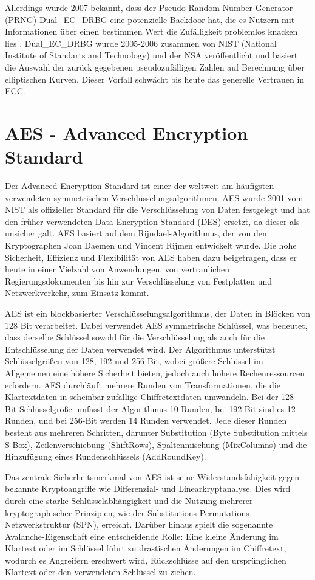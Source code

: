 \documentclass{scrreprt}
\begin{document}
Allerdings wurde 2007 bekannt, dass der Pseudo Random Number Generator (PRNG) Dual\_EC\_DRBG eine potenzielle Backdoor hat, die es Nutzern mit Informationen über einen bestimmen Wert die Zufälligkeit problemlos knacken lies \cite{ecc-green2013backdoor}. Dual\_EC\_DRBG wurde 2005-2006 zusammen von NIST (National Institute of Standarts and Technology) und der NSA veröffentlicht und basiert die Auswahl der zurück gegebenen pseudozufälligen Zahlen auf Berechnung über elliptischen Kurven. Dieser Vorfall schwächt bis heute das generelle Vertrauen in ECC. \cite{ecc-cloud2013elliptic}

\section{AES - Advanced Encryption Standard}
\label{sec:aes}
Der Advanced Encryption Standard ist einer der weltweit am häufigsten verwendeten symmetrischen Verschlüsselungsalgorithmen. AES wurde 2001 vom NIST als offizieller Standard für die Verschlüsselung von Daten festgelegt und hat den früher verwendeten Data Encryption Standard (DES) ersetzt, da dieser als unsicher galt. AES basiert auf dem Rijndael-Algorithmus, der von den Kryptographen Joan Daemen und Vincent Rijmen entwickelt wurde. Die hohe Sicherheit, Effizienz und Flexibilität von AES haben dazu beigetragen, dass er heute in einer Vielzahl von Anwendungen, von vertraulichen Regierungsdokumenten bis hin zur Verschlüsselung von Festplatten und Netzwerkverkehr, zum Einsatz kommt.

AES ist ein blockbasierter Verschlüsselungsalgorithmus, der Daten in Blöcken von 128 Bit verarbeitet. Dabei verwendet AES symmetrische Schlüssel, was bedeutet, dass derselbe Schlüssel sowohl für die Verschlüsselung als auch für die Entschlüsselung der Daten verwendet wird. Der Algorithmus unterstützt Schlüsselgrößen von 128, 192 und 256 Bit, wobei größere Schlüssel im Allgemeinen eine höhere Sicherheit bieten, jedoch auch höhere Rechenressourcen erfordern. AES durchläuft mehrere Runden von Transformationen, die die Klartextdaten in scheinbar zufällige Chiffretextdaten umwandeln. Bei der 128-Bit-Schlüsselgröße umfasst der Algorithmus 10 Runden, bei 192-Bit sind es 12 Runden, und bei 256-Bit werden 14 Runden verwendet. Jede dieser Runden besteht aus mehreren Schritten, darunter Substitution (Byte Substitution mittels S-Box), Zeilenverschiebung (ShiftRows), Spaltenmischung (MixColumns) und die Hinzufügung eines Rundenschlüssels (AddRoundKey).

Das zentrale Sicherheitsmerkmal von AES ist seine Widerstandsfähigkeit gegen bekannte Kryptoangriffe wie Differenzial- und Linearkryptanalyse. Dies wird durch eine starke Schlüsselabhängigkeit und die Nutzung mehrerer kryptographischer Prinzipien, wie der Substitutions-Permutations-Netzwerkstruktur (SPN), erreicht. Darüber hinaus spielt die sogenannte Avalanche-Eigenschaft eine entscheidende Rolle: Eine kleine Änderung im Klartext oder im Schlüssel führt zu drastischen Änderungen im Chiffretext, wodurch es Angreifern erschwert wird, Rückschlüsse auf den ursprünglichen Klartext oder den verwendeten Schlüssel zu ziehen.\\
\end{document}
